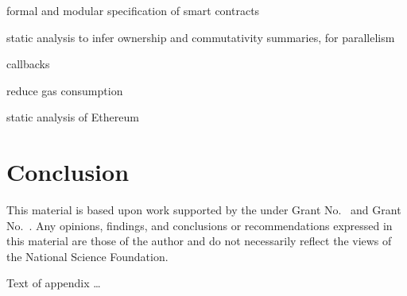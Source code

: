 \documentclass[acmsmall,review,anonymous]{acmart}\settopmatter{printfolios=true,printccs=false,printacmref=false}
\begin{document}
formal and modular specification of smart contracts \cite{DBLP:journals/pacmpl/BramEMSS21}

static analysis to infer ownership and commutativity summaries, for parallelism
\cite{DBLP:conf/pldi/Pirlea0S21}

callbacks \cite{DBLP:journals/pacmpl/AlbertGRRRS20, DBLP:journals/pacmpl/GrossmanAGMRSZ18}

reduce gas consumption \cite{DBLP:journals/pacmpl/GrechKJBSS18}

static analysis of Ethereum \cite{DBLP:journals/pacmpl/SmaragdakisGLTT21}

\section{Conclusion}


\begin{acks}                            %
  This material is based upon work supported by the
   under Grant
  No.~ and Grant
  No.~.  Any opinions, findings, and
  conclusions or recommendations expressed in this material are those
  of the author and do not necessarily reflect the views of the
  National Science Foundation.
\end{acks}






Text of appendix \ldots
\end{document}
